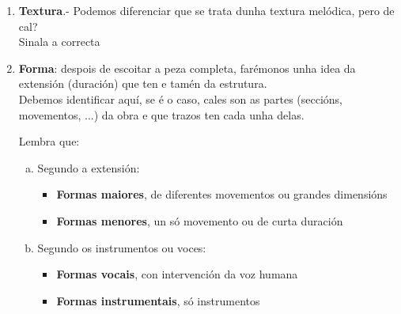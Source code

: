 \begin{enumerate}[1.-]
\begin{itemize}
            \end{itemize}
%
        \item %
        \textbf{Textura}.- Podemos diferenciar que se trata dunha textura melódica, pero de cal? \\
        Sinala a correcta
            \begin{itemize}
            \end{itemize}
%
        \item %
        \textbf{Forma}: despois de escoitar a peza completa, farémonos unha idea da extensión (duración) que ten e tamén da estrutura. \\ 
        Debemos identificar aquí, se é o caso, cales son as partes (seccións, movementos, ...) da obra e que trazos ten cada unha delas.
        \par 
        Lembra que:
            \begin{enumerate}[a)]
                \item
                Segundo a extensión:
                \begin{itemize}
                    \item
                    \textbf{Formas maiores}, de diferentes movementos ou grandes dimensións
                    \item
                    \textbf{Formas menores}, un só movemento ou de curta duración
                \end{itemize}
                \item
                Segundo os instrumentos ou voces:
                 \begin{itemize}
                    \item
                    \textbf{Formas vocais}, con intervención da voz humana
                    \item
                    \textbf{Formas instrumentais}, só instrumentos
                \end{itemize}

\end{enumerate}
\end{enumerate}
